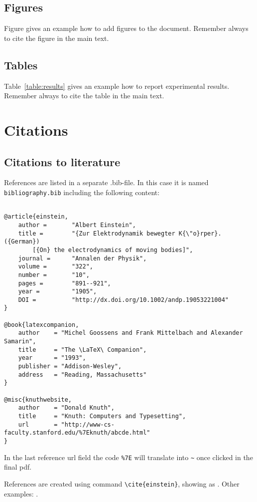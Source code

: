 \section{Figures}
Figure gives an example how to add figures to the document. Remember always to cite the figure in the main text.


\section{Tables}

Table~\ref{table:results} gives an example how to report experimental results. Remember always to cite the table in the main text. 


\chapter{Citations}

\section{Citations to literature}

References are listed in a separate .bib-file. In this case it is named \texttt{bibliography.bib} including the following content:
\begin{verbatim}

@article{einstein,
    author =       "Albert Einstein",
    title =        "{Zur Elektrodynamik bewegter K{\"o}rper}. ({German})
        [{On} the electrodynamics of moving bodies]",
    journal =      "Annalen der Physik",
    volume =       "322",
    number =       "10",
    pages =        "891--921",
    year =         "1905",
    DOI =          "http://dx.doi.org/10.1002/andp.19053221004"
}
 
@book{latexcompanion,
    author    = "Michel Goossens and Frank Mittelbach and Alexander Samarin",
    title     = "The \LaTeX\ Companion",
    year      = "1993",
    publisher = "Addison-Wesley",
    address   = "Reading, Massachusetts"
}
 
@misc{knuthwebsite,
    author    = "Donald Knuth",
    title     = "Knuth: Computers and Typesetting",
    url       = "http://www-cs-faculty.stanford.edu/%7Eknuth/abcde.html"
}
\end{verbatim}

In the last reference url field the code \verb+%7E+ will translate into \verb+~+ once clicked in the final pdf.

References are created using command \texttt{\textbackslash cite\{einstein\}}, showing as \citep{einstein}. Other examples: \citep{latexcompanion,knuthwebsite}.

